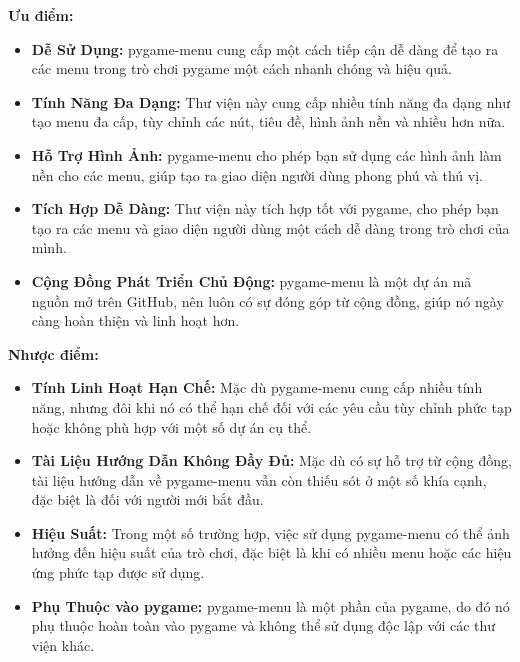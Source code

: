 \documentclass[a4paper]{article}
\begin{document}
\begin{par}
    \textbf{Ưu điểm:}
\begin{itemize}
    \item \textbf{Dễ Sử Dụng:} pygame-menu cung cấp một cách tiếp cận dễ dàng để tạo ra các menu trong trò chơi pygame một cách nhanh chóng và hiệu quả.
    
    \item \textbf{Tính Năng Đa Dạng:} Thư viện này cung cấp nhiều tính năng đa dạng như tạo menu đa cấp, tùy chỉnh các nút, tiêu đề, hình ảnh nền và nhiều hơn nữa.
    
    \item \textbf{Hỗ Trợ Hình Ảnh:} pygame-menu cho phép bạn sử dụng các hình ảnh làm nền cho các menu, giúp tạo ra giao diện người dùng phong phú và thú vị.
    
    \item \textbf{Tích Hợp Dễ Dàng:} Thư viện này tích hợp tốt với pygame, cho phép bạn tạo ra các menu và giao diện người dùng một cách dễ dàng trong trò chơi của mình.
    
    \item \textbf{Cộng Đồng Phát Triển Chủ Động:} pygame-menu là một dự án mã nguồn mở trên GitHub, nên luôn có sự đóng góp từ cộng đồng, giúp nó ngày càng hoàn thiện và linh hoạt hơn.
\end{itemize}

\textbf{Nhược điểm:}
\begin{itemize}
    \item \textbf{Tính Linh Hoạt Hạn Chế:} Mặc dù pygame-menu cung cấp nhiều tính năng, nhưng đôi khi nó có thể hạn chế đối với các yêu cầu tùy chỉnh phức tạp hoặc không phù hợp với một số dự án cụ thể.
    
    \item \textbf{Tài Liệu Hướng Dẫn Không Đầy Đủ:} Mặc dù có sự hỗ trợ từ cộng đồng, tài liệu hướng dẫn về pygame-menu vẫn còn thiếu sót ở một số khía cạnh, đặc biệt là đối với người mới bắt đầu.
    
    \item \textbf{Hiệu Suất:} Trong một số trường hợp, việc sử dụng pygame-menu có thể ảnh hưởng đến hiệu suất của trò chơi, đặc biệt là khi có nhiều menu hoặc các hiệu ứng phức tạp được sử dụng.
    
    \item \textbf{Phụ Thuộc vào pygame:} pygame-menu là một phần của pygame, do đó nó phụ thuộc hoàn toàn vào pygame và không thể sử dụng độc lập với các thư viện khác.
\end{itemize}
\end{par}
\end{document}
